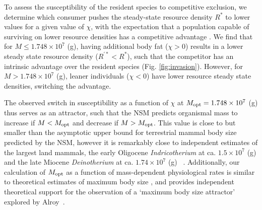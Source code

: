 \documentclass[twocolumn,preprintnumbers,amsmath,amssymb,superscriptaddress]{revtex4}
\begin{document}
To assess the susceptibility of the resident species to competitive exclusion, we determine which consumer pushes the steady-state resource density $R^*$ to lower values for a given value of $\chi$, with the expectation that a population capable of surviving on lower resource densities has a competitive advantage \citep{tilman1981}.
We find that for $M\leq 1.748\times10^7$ (g), having additional body fat ($\chi > 0$) results in a lower steady state resource density ($R^{\prime *}<R^*$), such that the competitor has an intrinsic advantage over the resident species (Fig. \ref{fig:invasion}).
However, for $M> 1.748\times10^7$ (g), leaner individuals ($\chi < 0$) have lower resource steady state densities, switching the advantage.


The observed switch in susceptibility as a function of $\chi$ at $M_{\rm opt}= 1.748\times10^7$ (g) thus serves as an attractor, such that the NSM predicts organismal mass to increase if $M<M_{\rm opt}$ and decrease if $M>M_{\rm opt}$.
This value is close to but smaller than the asymptotic upper bound for terrestrial mammal body size predicted by the NSM, however it is remarkably close to independent estimates of the largest land mammals, the early Oligocene \emph{Indricotherium} at ca. $1.5\times10^7$ (g) and the late Miocene \emph{Deinotherium} at ca. $1.74\times10^7$ (g) ~\citep{Smith:2010p3442}.
Additionally, our calculation of $M_{\rm opt}$ as a function of mass-dependent physiological rates is similar to theoretical estimates of maximum body size \citep{Clauset:2009fh}, and provides independent theoretical support for the observation of a `maximum body size attractor' explored by Alroy~\citep{Alroy:1998p1594}. 
\end{document}
